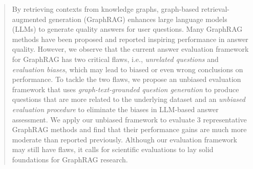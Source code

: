 \documentclass[sigconf,nonacm]{acmart}
\begin{document}
\begin{abstract}
By retrieving contexts from knowledge graphs, graph-based retrieval-augmented generation (GraphRAG) enhances large language models (LLMs) to generate quality answers for user questions. Many GraphRAG methods have been proposed and reported inspiring performance in answer quality. However, we observe that the current answer evaluation framework for GraphRAG has two critical flaws, i.e., \textit{unrelated questions} and \textit{evaluation biases}, which may lead to biased or even wrong conclusions on performance. To tackle the two flaws, we propose an unbiased evaluation framework that uses \textit{graph-text-grounded question generation} to produce questions that are more related to the underlying dataset and an \textit{unbiased evaluation procedure} to eliminate the biases in LLM-based answer assessment. We apply our unbiased framework to evaluate 3 representative GraphRAG methods and find that their performance gains are much more moderate than reported previously. Although our evaluation framework may still have flaws, it calls for scientific evaluations to lay solid foundations for GraphRAG research. 
\end{abstract}

\end{document}
